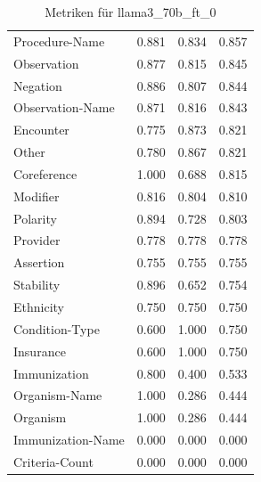 \begin{table}[htbp]
\begin{tabular}{p{5cm}ccc}
Procedure-Name & 0.881 & 0.834 & 0.857 \\
Observation & 0.877 & 0.815 & 0.845 \\
Negation & 0.886 & 0.807 & 0.844 \\
Observation-Name & 0.871 & 0.816 & 0.843 \\
Encounter & 0.775 & 0.873 & 0.821 \\
Other & 0.780 & 0.867 & 0.821 \\
Coreference & 1.000 & 0.688 & 0.815 \\
Modifier & 0.816 & 0.804 & 0.810 \\
Polarity & 0.894 & 0.728 & 0.803 \\
Provider & 0.778 & 0.778 & 0.778 \\
Assertion & 0.755 & 0.755 & 0.755 \\
Stability & 0.896 & 0.652 & 0.754 \\
Ethnicity & 0.750 & 0.750 & 0.750 \\
Condition-Type & 0.600 & 1.000 & 0.750 \\
Insurance & 0.600 & 1.000 & 0.750 \\
Immunization & 0.800 & 0.400 & 0.533 \\
Organism-Name & 1.000 & 0.286 & 0.444 \\
Organism & 1.000 & 0.286 & 0.444 \\
Immunization-Name & 0.000 & 0.000 & 0.000 \\
Criteria-Count & 0.000 & 0.000 & 0.000 \\
\bottomrule
\end{tabular}
\caption{Metriken für llama3_70b_ft_0}
\label{tab:metrics_llama3_70b_ft_0}
\end{table}